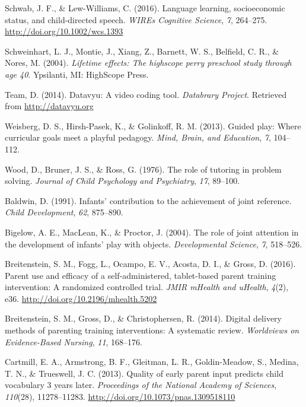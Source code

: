 \documentclass[man,floatsintext]{apa6}
\begin{document}
\leavevmode\hypertarget{ref-Schwab2016}{}%
Schwab, J. F., \& Lew-Williams, C. (2016). Language learning, socioeconomic status, and child-directed speech. \emph{WIREs Cognitive Science}, \emph{7}, 264--275. \url{http://doi.org/10.1002/wcs.1393}

\leavevmode\hypertarget{ref-PerryPreschool2004}{}%
Schweinhart, L. J., Montie, J., Xiang, Z., Barnett, W. S., Belfield, C. R., \& Nores, M. (2004). \emph{Lifetime effects: The highscope perry preschool study through age 40}. Ypsilanti, MI: HighScope Press.

\leavevmode\hypertarget{ref-datavyu}{}%
Team, D. (2014). Datavyu: A video coding tool. \emph{Databrary Project}. Retrieved from \url{http://datavyu.org}

\leavevmode\hypertarget{ref-Weisberg2013}{}%
Weisberg, D. S., Hirsh-Pasek, K., \& Golinkoff, R. M. (2013). Guided play: Where curricular goals meet a playful pedagogy. \emph{Mind, Brain, and Education}, \emph{7}, 104--112.

\leavevmode\hypertarget{ref-Wood1976}{}%
Wood, D., Bruner, J. S., \& Ross, G. (1976). The role of tutoring in problem solving. \emph{Journal of Child Psychology and Psychiatry}, \emph{17}, 89--100.

\leavevmode\hypertarget{ref-Baldwin1991}{}%
Baldwin, D. (1991). Infants' contribution to the achievement of joint reference. \emph{Child Development}, \emph{62}, 875--890.

\leavevmode\hypertarget{ref-Bigelow2004}{}%
Bigelow, A. E., MacLean, K., \& Proctor, J. (2004). The role of joint attention in the development of infants' play with objects. \emph{Developmental Science}, \emph{7}, 518--526.

\leavevmode\hypertarget{ref-Breitenstein2016}{}%
Breitenstein, S. M., Fogg, L., Ocampo, E. V., Acosta, D. I., \& Gross, D. (2016). Parent use and efficacy of a self-administered, tablet-based parent training intervention: A randomized controlled trial. \emph{JMIR mHealth and uHealth}, \emph{4}(2), e36. \url{http://doi.org/10.2196/mhealth.5202}

\leavevmode\hypertarget{ref-Breitenstein2014}{}%
Breitenstein, S. M., Gross, D., \& Christophersen, R. (2014). Digital delivery methods of parenting training interventions: A systematic review. \emph{Worldviews on Evidence-Based Nursing}, \emph{11}, 168--176.

\leavevmode\hypertarget{ref-Cartmill2013}{}%
Cartmill, E. A., Armstrong, B. F., Gleitman, L. R., Goldin-Meadow, S., Medina, T. N., \& Trueswell, J. C. (2013). Quality of early parent input predicts child vocabulary 3 years later. \emph{Proceedings of the National Academy of Sciences}, \emph{110}(28), 11278--11283. \url{http://doi.org/10.1073/pnas.1309518110}
\end{document}

